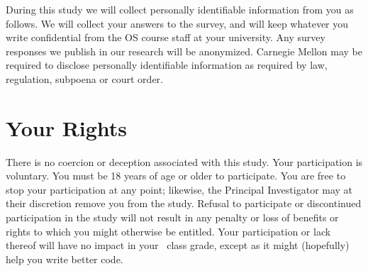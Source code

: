 \documentclass{article}
\begin{document}
During this study we will collect personally identifiable information from you as follows.
We will collect your answers to the survey, and will keep whatever you write confidential from the OS course staff at your university.
Any survey responses we publish in our research will be anonymized.
Carnegie Mellon may be required to disclose personally identifiable information as required by law, regulation, subpoena or court order.
%
%

\section{Your Rights}
There is no coercion or deception associated with this study.
Your participation is voluntary.
You must be 18 years of age or older to participate.
You are free to stop your participation at any point; likewise, the Principal Investigator may at their discretion remove you from the study.
Refusal to participate or discontinued participation in the study will not result in any penalty or loss of benefits or rights to which you might otherwise be entitled.
Your participation or lack thereof will have no impact in your \classname~class grade, except as it might (hopefully) help you write better code.
\\
\end{document}
